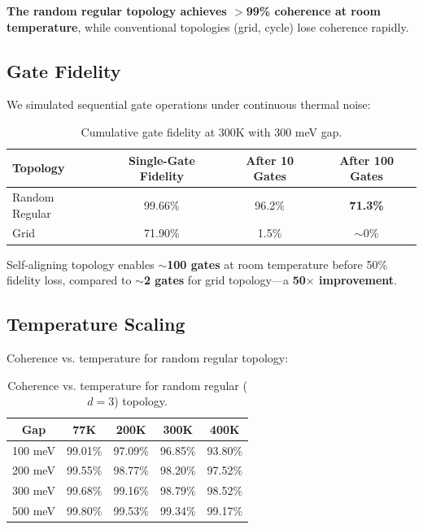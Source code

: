 \documentclass[11pt,a4paper]{article}
\theoremstyle{plain}
\theoremstyle{definition}
\theoremstyle{remark}
\begin{document}
\textbf{The random regular topology achieves $>$99\% coherence at room temperature}, while conventional topologies (grid, cycle) lose coherence rapidly.

\subsection{Gate Fidelity}

We simulated sequential gate operations under continuous thermal noise:

\begin{table}[H]
\centering
\begin{tabular}{@{}lccc@{}}
\toprule
\textbf{Topology} & \textbf{Single-Gate Fidelity} & \textbf{After 10 Gates} & \textbf{After 100 Gates} \\
\midrule
Random Regular & 99.66\% & 96.2\% & \textbf{71.3\%} \\
Grid & 71.90\% & 1.5\% & $\sim 0$\% \\
\bottomrule
\end{tabular}
\caption{Cumulative gate fidelity at 300K with 300 meV gap.}
\label{tab:gates}
\end{table}

\begin{keyresult}
Self-aligning topology enables $\sim$\textbf{100 gates} at room temperature before 50\% fidelity loss, compared to $\sim$\textbf{2 gates} for grid topology---a \textbf{50$\times$ improvement}.
\end{keyresult}

\subsection{Temperature Scaling}

Coherence vs. temperature for random regular topology:

\begin{table}[H]
\centering
\begin{tabular}{@{}ccccc@{}}
\toprule
\textbf{Gap} & \textbf{77K} & \textbf{200K} & \textbf{300K} & \textbf{400K} \\
\midrule
100 meV & 99.01\% & 97.09\% & 96.85\% & 93.80\% \\
200 meV & 99.55\% & 98.77\% & 98.20\% & 97.52\% \\
300 meV & 99.68\% & 99.16\% & 98.79\% & 98.52\% \\
500 meV & 99.80\% & 99.53\% & 99.34\% & 99.17\% \\
\bottomrule
\end{tabular}
\caption{Coherence vs. temperature for random regular ($d=3$) topology.}
\label{tab:temperature}
\end{table}
\end{document}

